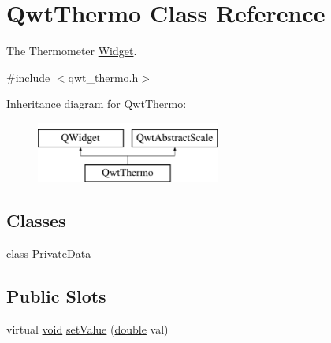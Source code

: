 \hypertarget{class_qwt_thermo}{\section{Qwt\-Thermo Class Reference}
\label{class_qwt_thermo}
}


The Thermometer \hyperlink{class_widget}{Widget}.  




{\ttfamily \#include $<$qwt\-\_\-thermo.\-h$>$}

Inheritance diagram for Qwt\-Thermo\-:\begin{figure}[H]
\begin{center}
\leavevmode
\includegraphics[height=2.000000cm]{class_qwt_thermo}
\end{center}
\end{figure}
\subsection*{Classes}
\begin{DoxyCompactItemize}
\item 
class \hyperlink{class_qwt_thermo_1_1_private_data}{Private\-Data}
\end{DoxyCompactItemize}
\subsection*{Public Slots}
\begin{DoxyCompactItemize}
\item 
virtual \hyperlink{group___u_a_v_objects_plugin_ga444cf2ff3f0ecbe028adce838d373f5c}{void} \hyperlink{class_qwt_thermo_ad54ebf4761c12f948d09cd45a26d1fd4}{set\-Value} (\hyperlink{_super_l_u_support_8h_a8956b2b9f49bf918deed98379d159ca7}{double} val)
\end{DoxyCompactItemize}
